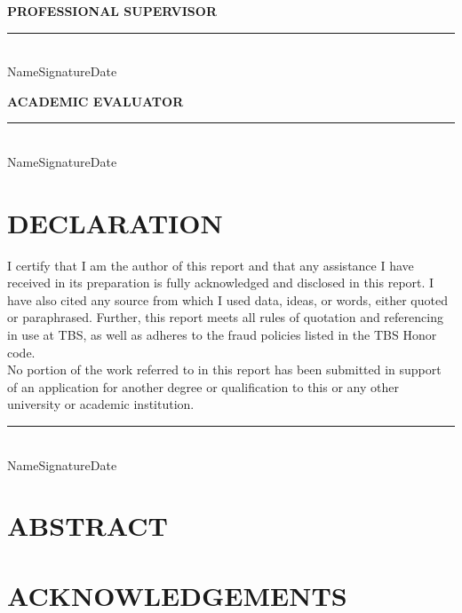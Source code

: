 \documentclass[11pt, a4paper]{report}
\begin{document}
      \noindent \textbf {PROFESSIONAL SUPERVISOR}
      
      \vspace{1cm} 
      \noindent \rule{\textwidth}{0.01pt} \\
      \noindent Name\hfill Signature\hfill Date

      \vspace{1cm} %
      
      \noindent \textbf {ACADEMIC EVALUATOR}
      
      \vspace{1cm} 
      \noindent \rule{\textwidth}{0.01pt} \\
      \noindent Name\hfill Signature\hfill Date

    \newpage
      \thispagestyle{plain}
      \chapter*{DECLARATION}
      
      \vspace{1cm}

      {I certify that I am the author of this report and that any assistance I have received in its preparation is fully acknowledged and disclosed in this report. I have also cited any source from which I used data, ideas, or words, either quoted or paraphrased. Further, this report meets all rules of quotation and referencing in use at TBS, as well as adheres to the fraud policies listed in the TBS Honor code. \\
      No portion of the work referred to in this report has been submitted in support of an application for another degree or qualification to this or any other university or academic institution.}

      \vspace{3cm}
      \noindent \rule{\textwidth}{0.01pt} \\
      \noindent Name\hfill Signature\hfill Date

    \newpage
      \thispagestyle{plain}
      \chapter*{ABSTRACT}

    \newpage
      \thispagestyle{plain}
      \chapter*{ACKNOWLEDGEMENTS}
\end{document}
